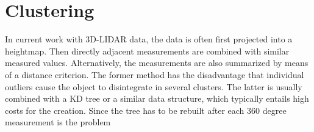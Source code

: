 \documentclass[11pt,oneside,openright]{mpreport}
\begin{document}
\section{Clustering}
In current work with 3D-LIDAR data, the data is often first projected into a heightmap. Then directly adjacent measurements are combined with similar measured values.
Alternatively, the measurements are also summarized by means of a distance criterion. 
The former method has the disadvantage that individual outliers cause the object to disintegrate in several clusters.
The latter is usually combined with a KD tree or a similar data structure, which typically entails high costs for the creation.
Since the tree has to be rebuilt after each 360 degree measurement is the problem
\end{document}
